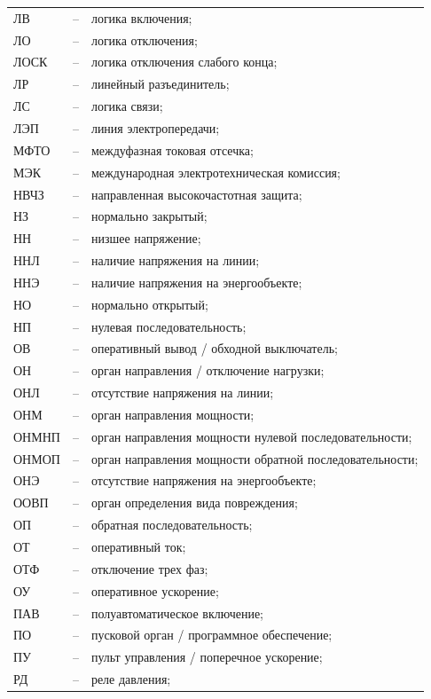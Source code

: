 \documentclass[a4paper, 12pt, table, hidelinks, DIV=calc]{extarticle}
\begin{document}
\begin{longtable}{>{\raggedright\arraybackslash}m{2cm}>{\raggedright\arraybackslash}m{0.5cm}>{\raggedright\arraybackslash}m{20cm}}
ЛВ & -- & логика включения; \\
ЛО & -- & логика отключения; \\
ЛОСК & -- & логика отключения слабого конца; \\
ЛР & -- & линейный разъединитель; \\
ЛС & -- & логика связи; \\
ЛЭП & -- & линия электропередачи; \\
МФТО & -- & междуфазная токовая отсечка; \\
МЭК & -- & международная электротехническая комиссия; \\
НВЧЗ & -- & направленная высокочастотная защита; \\
НЗ & -- & нормально закрытый; \\
НН & -- & низшее напряжение; \\
ННЛ & -- & наличие напряжения на линии; \\
ННЭ & -- & наличие напряжения на энергообъекте; \\
НО & -- & нормально открытый; \\
НП & -- & нулевая последовательность; \\
ОВ & -- & оперативный вывод / обходной выключатель; \\
ОН & -- & орган направления / отключение нагрузки; \\
ОНЛ & -- & отсутствие напряжения на линии; \\
ОНМ & -- & орган направления мощности; \\
ОНМНП & -- & орган направления мощности нулевой последовательности; \\
ОНМОП & -- & орган направления мощности обратной последовательности; \\
ОНЭ & -- & отсутствие напряжения на энергообъекте; \\
ООВП & -- & орган определения вида повреждения; \\
ОП & -- & обратная последовательность; \\
ОТ & -- & оперативный ток; \\
ОТФ & -- & отключение трех фаз; \\
ОУ & -- & оперативное ускорение; \\
ПАВ & -- & полуавтоматическое включение; \\
ПО & -- & пусковой орган / программное обеспечение; \\
ПУ & -- & пульт управления / поперечное ускорение; \\
РД & -- & реле давления; \\

\end{longtable}
\end{document}
